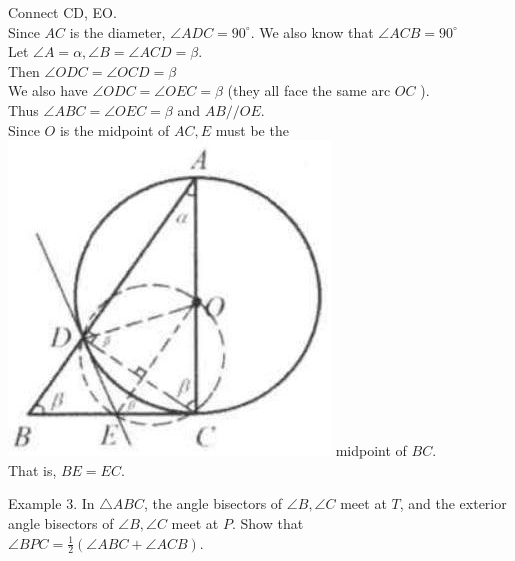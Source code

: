 \documentclass[10pt]{article}
\begin{document}
Connect CD, EO.\\
Since \(A C\) is the diameter, \(\angle A D C=90^{\circ}\). We also know that \(\angle A C B=90^{\circ}\)\\
Let \(\angle A=\alpha, \angle B=\angle A C D=\beta\).\\
Then \(\angle O D C=\angle O C D=\beta\)\\
We also have \(\angle O D C=\angle O E C=\beta\) (they all face the same arc \(O C\) ).\\
Thus \(\angle A B C=\angle O E C=\beta\) and \(A B / / O E\).\\
Since \(O\) is the midpoint of \(A C, E\) must be the\\
\includegraphics[max width=\textwidth]{2025_04_17_97bc1f7e44d93c271a88g-195(2)} midpoint of \(B C\).\\
That is, \(B E=E C\).

Example 3. In \(\triangle A B C\), the angle bisectors of \(\angle B, \angle C\) meet at \(T\), and the exterior angle bisectors of \(\angle B, \angle C\) meet at \(P\). Show that\\
\(\angle B P C=\frac{1}{2}(\angle A B C+\angle A C B)\).
\end{document}
